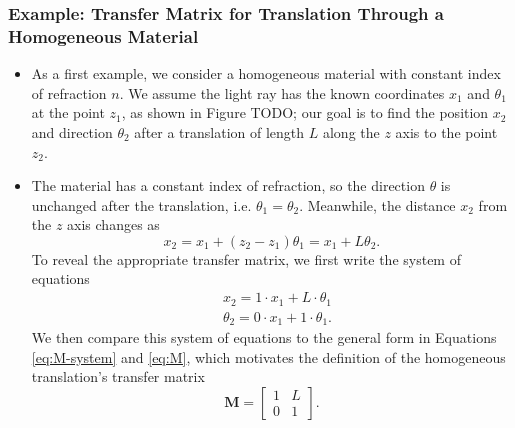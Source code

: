 \documentclass[11pt, a4paper]{article}
\newcommand{\mat}[1]{\mathbf{#1}} %
\begin{document}
\subsubsection{Example: Transfer Matrix for Translation Through a Homogeneous Material} \label{sss:M-homogeneous}
\begin{itemize}
    \item As a first example, we consider a homogeneous material with constant index of refraction $ n $. We assume the light ray has the known coordinates $ x_{1} $ and $ \theta_{1} $ at the point $ z_{1} $, as shown in Figure TODO; our goal is to find the position $ x_{2} $ and direction $ \theta_{2} $ after a translation of length $ L $ along the $ z $ axis to the point $ z_{2} $.

    \item The material has a constant index of refraction, so the direction $ \theta $ is unchanged after the translation, i.e. $ \theta_{1} = \theta_{2} $. Meanwhile, the distance $ x_{2} $ from the $ z $ axis changes as
    \begin{equation*}
        x_{2} = x_{1} + (z_{2} - z_{1}) \theta_{1} = x_{1} + L \theta_{2}.
    \end{equation*}
    To reveal the appropriate transfer matrix, we first write the system of equations
    \begin{align*}
        & x_{2} = 1 \cdot x_{1} + L \cdot \theta_{1}\\
        & \theta_{2} = 0 \cdot x_{1} + 1 \cdot \theta_{1}.
    \end{align*}
    We then compare this system of equations to the general form in Equations \ref{eq:M-system} and \ref{eq:M}, which motivates the definition of the homogeneous translation's transfer matrix
    \begin{equation*}
        \mat{M} = 
        \begin{bmatrix}
            1 & L\\
            0 & 1
        \end{bmatrix}.
    \end{equation*}
    
\end{itemize}
\end{document}
